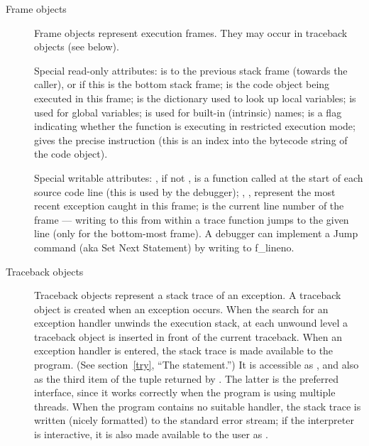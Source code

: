 \begin{description}
\begin{description}
\item[Frame objects]
Frame objects represent execution frames.  They may occur in traceback
objects (see below).

Special read-only attributes:  is to the previous
stack frame (towards the caller), or  if this is the bottom
stack frame;  is the code object being executed in this
frame;  is the dictionary used to look up local
variables;  is used for global variables;
 is used for built-in (intrinsic) names;
 is a flag indicating whether the function is
executing in restricted execution mode;  gives the
precise instruction (this is an index into the bytecode string of
the code object).

Special writable attributes: , if not , is a
function called at the start of each source code line (this is used by
the debugger); , ,
 represent the most recent exception caught in
this frame;  is the current line number of the frame
--- writing to this from within a trace function jumps to the given line
(only for the bottom-most frame).  A debugger can implement a Jump
command (aka Set Next Statement) by writing to f_lineno.

\item[Traceback objects] \label{traceback}
Traceback objects represent a stack trace of an exception.  A
traceback object is created when an exception occurs.  When the search
for an exception handler unwinds the execution stack, at each unwound
level a traceback object is inserted in front of the current
traceback.  When an exception handler is entered, the stack trace is
made available to the program.
(See section~\ref{try}, ``The  statement.'')
It is accessible as , and also as the third
item of the tuple returned by .  The latter is
the preferred interface, since it works correctly when the program is
using multiple threads.
When the program contains no suitable handler, the stack trace is written
(nicely formatted) to the standard error stream; if the interpreter is
interactive, it is also made available to the user as
.


\end{description}
\end{description}

